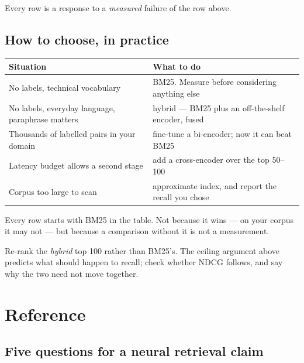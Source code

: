 \documentclass[11pt,a4paper]{article}
\begin{document}
Every row is a response to a \emph{measured} failure of the row above.

\subsection{How to choose, in practice}

\begin{center}
\small
\begin{tabular}{p{}p{}}
\toprule
\textbf{Situation} & \textbf{What to do} \\
\midrule
No labels, technical vocabulary & BM25. Measure before considering anything
else \\
No labels, everyday language, paraphrase matters & hybrid --- BM25 plus an
off-the-shelf encoder, fused \\
Thousands of labelled pairs in your domain & fine-tune a bi-encoder; now it can
beat BM25 \\
Latency budget allows a second stage & add a cross-encoder over the top
50--100 \\
Corpus too large to scan & approximate index, and report the recall you chose \\
\bottomrule
\end{tabular}
\end{center}

Every row starts with BM25 in the table. Not because it wins --- on your corpus
it may not --- but because a comparison without it is not a measurement.

\begin{trybox}[title={Exercise 20.1}]
Re-rank the \emph{hybrid} top 100 rather than BM25's. The ceiling argument
above predicts what should happen to recall; check whether NDCG follows, and
say why the two need not move together.
\end{trybox}

\section{Reference}

\subsection{Five questions for a neural retrieval claim}
\end{document}
